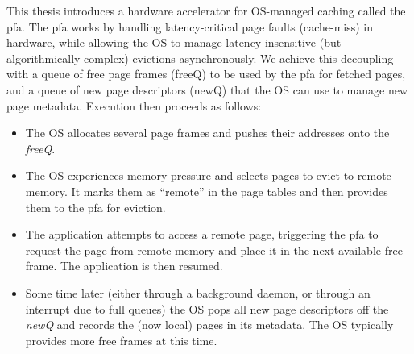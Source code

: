 This thesis introduces a hardware accelerator for OS-managed caching called the
\gls{pfa}. The \gls{pfa} works by handling latency-critical page faults
(cache-miss) in hardware, while allowing the OS to manage latency-insensitive
(but algorithmically complex) evictions asynchronously. We achieve this
decoupling with a queue of free page frames (freeQ) to be used by the \gls{pfa}
for fetched pages, and a queue of new page descriptors (newQ) that the OS can
use to manage new page metadata. Execution then proceeds as follows:

\begin{itemize}
	 \item The OS allocates several page frames and pushes their addresses onto
		 the \emph{freeQ}.
   \item The OS experiences memory pressure and selects pages to evict to
		 remote memory. It marks them as ``remote'' in the page tables and then
     provides them to the \gls{pfa} for eviction.
   \item The application attempts to access a remote page, triggering the
     \gls{pfa}
		 to request the page from remote memory and place it in the next
		 available free frame. The application is then resumed.
	 \item Some time later (either through a background daemon, or through an
		 interrupt due to full queues) the OS pops all new page descriptors off
		 the \emph{newQ} and records the (now local) pages in its metadata. The
		 OS typically provides more free frames at this time.
\end{itemize}


